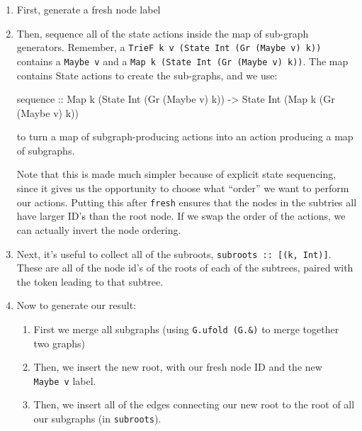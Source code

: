 \documentclass[]{article}
\newenvironment{Shaded}{}{}
\newcommand{\DataTypeTok}[1]{\textcolor[rgb]{0.56,0.13,0.00}{#1}}
\newcommand{\NormalTok}[1]{#1}
\newcommand{\OtherTok}[1]{\textcolor[rgb]{0.00,0.44,0.13}{#1}}
\begin{document}
\begin{enumerate}
\def\labelenumi{\arabic{enumi}.}
\item
  First, generate a fresh node label
\item
  Then, sequence all of the state actions inside the map of sub-graph
  generators. Remember, a
  \texttt{TrieF\ k\ v\ (State\ Int\ (Gr\ (Maybe\ v)\ k))} contains a
  \texttt{Maybe\ v} and a \texttt{Map\ k\ (State\ Int\ (Gr\ (Maybe\ v)\ k))}.
  The map contains State actions to create the sub-graphs, and we use:

\begin{Shaded}
\begin{Highlighting}[]
\NormalTok{sequence}
\OtherTok{    ::} \DataTypeTok{Map}\NormalTok{ k (}\DataTypeTok{State} \DataTypeTok{Int}\NormalTok{ (}\DataTypeTok{Gr}\NormalTok{ (}\DataTypeTok{Maybe}\NormalTok{ v) k))}
    \OtherTok{->} \DataTypeTok{State} \DataTypeTok{Int}\NormalTok{ (}\DataTypeTok{Map}\NormalTok{ k (}\DataTypeTok{Gr}\NormalTok{ (}\DataTypeTok{Maybe}\NormalTok{ v) k))}
\end{Highlighting}
\end{Shaded}

  to turn a map of subgraph-producing actions into an action producing a map of
  subgraphs.

  Note that this is made much simpler because of explicit state sequencing,
  since it gives us the opportunity to choose what ``order'' we want to perform
  our actions. Putting this after \texttt{fresh} ensures that the nodes in the
  subtries all have larger ID's than the root node. If we swap the order of the
  actions, we can actually invert the node ordering.
\item
  Next, it's useful to collect all of the subroots,
  \texttt{subroots\ ::\ {[}(k,\ Int){]}}. These are all of the node id's of the
  roots of each of the subtrees, paired with the token leading to that subtree.
\item
  Now to generate our result:

  \begin{enumerate}
  \def\labelenumii{\alph{enumii}.}
  \tightlist
  \item
    First we merge all subgraphs (using \texttt{G.ufold\ (G.\&)} to merge
    together two graphs)
  \item
    Then, we insert the new root, with our fresh node ID and the new
    \texttt{Maybe\ v} label.
  \item
    Then, we insert all of the edges connecting our new root to the root of all
    our subgraphs (in \texttt{subroots}).
  \end{enumerate}
\end{enumerate}
\end{document}
